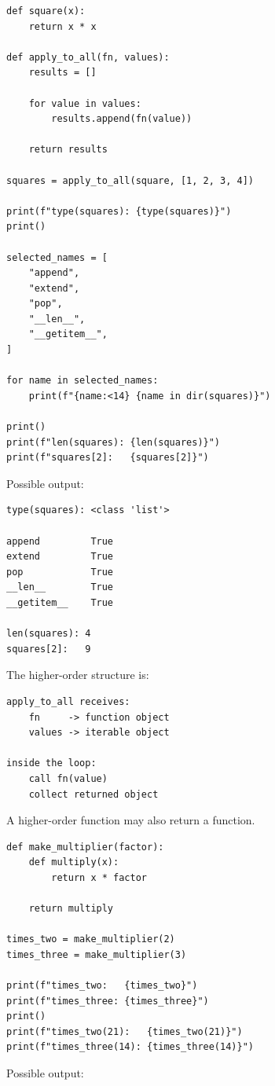 \begin{verbatim}
def square(x):
    return x * x

def apply_to_all(fn, values):
    results = []

    for value in values:
        results.append(fn(value))

    return results

squares = apply_to_all(square, [1, 2, 3, 4])

print(f"type(squares): {type(squares)}")
print()

selected_names = [
    "append",
    "extend",
    "pop",
    "__len__",
    "__getitem__",
]

for name in selected_names:
    print(f"{name:<14} {name in dir(squares)}")

print()
print(f"len(squares): {len(squares)}")
print(f"squares[2]:   {squares[2]}")
\end{verbatim}

Possible output:

\begin{verbatim}
type(squares): <class 'list'>

append         True
extend         True
pop            True
__len__        True
__getitem__    True

len(squares): 4
squares[2]:   9
\end{verbatim}

The higher-order structure is:

\begin{verbatim}
apply_to_all receives:
    fn     -> function object
    values -> iterable object

inside the loop:
    call fn(value)
    collect returned object
\end{verbatim}

A higher-order function may also return a function.

\begin{verbatim}
def make_multiplier(factor):
    def multiply(x):
        return x * factor

    return multiply

times_two = make_multiplier(2)
times_three = make_multiplier(3)

print(f"times_two:   {times_two}")
print(f"times_three: {times_three}")
print()
print(f"times_two(21):   {times_two(21)}")
print(f"times_three(14): {times_three(14)}")
\end{verbatim}

Possible output:

